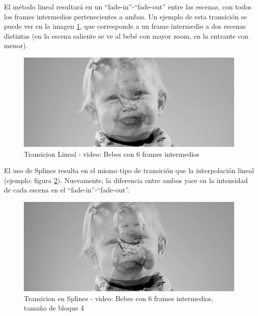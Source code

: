 \par El m\'etodo lineal resultar\'a en un ``fade-in''-``fade-out'' entre las escenas, con todos los frames intermedios pertenecientes a ambas.
Un ejemplo de esta transici\'on se puede ver en la imagen \ref{BebesLinealTransicion}, que corresponde a un frame intermedio a dos escenas distintas (en la escena saliente se ve al beb\'e con mayor zoom, en la entrante con menor).

\FloatBarrier
\begin{figure}[h]
\begin{center}
\caption{Transicion Lineal - video: Bebes con 6 frames intermedios}
\label{BebesLinealTransicion}
\includegraphics[width=0.9\columnwidth]{imagenes/cualitativos/BLT.png}
\end{center}
\end{figure}
\FloatBarrier

\par El uso de Splines resulta en el mismo tipo de transici\'on que la interpolaci\'on lineal (ejemplo: figura \ref{BebesSplinesTransicion}).
Nuevamente, la diferencia entre ambos yace en la intensidad de cada escena en el ``fade-in''-``fade-out''.

\FloatBarrier
\begin{figure}[h]
\begin{center}
\caption{Transicion en Splines - video: Bebes con 6 frames intermedios, tama\~no de bloque 4}
\label{BebesSplinesTransicion}
\includegraphics[width=0.9\columnwidth]{imagenes/cualitativos/BST.png}
\end{center}
\end{figure}
\FloatBarrier

